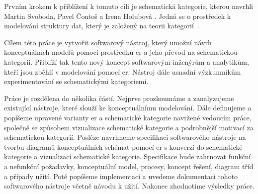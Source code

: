 Prvním krokem k přiblížení k tomuto cíli je schematická kategorie, kterou navrhli Martin Svoboda, Pavel Čontoš a Irena Holubová \cite{svoboda_categorical_2021}.
Jedná se o prostředek k modelování struktury dat, který je založený na teorii kategorií~\cite{eilenberg_generaltheory_1945}.

Cílem této práce je vytvořit softwarový nástroj, který umožní návrh konceptuálních modelů pomocí prostředků \acrshort{er} a jeho převod na schematickou kategorii.
Přiblíží tak tento nový koncept softwarovým inženýrům a analytikům, kteří jsou zběhlí v modelování pomocí \acrshort{er}.
Nástroj dále usnadní výzkumníkům experimentování se schematickými kategoriemi.

Práce je rozdělena do několika částí.
Nejprve prozkoumáme a zanalyzujeme existující nástroje, které slouží ke konceptuálnímu modelování.
Dále definujeme a popíšeme upravené varianty \acrshort{er} a schematické kategorie navržené vedoucím práce, společně se způsobem vizualizace schematické kategorie a podrobnější motivací za schematickou kategorií.
Posléze navrhneme specifikaci softwarového nástroje na tvorbu diagramů konceptuálních schémat pomocí \acrshort{er} s konverzí do schematické kategorie a vizualizací schematické kategorie.
Specifikace bude zahrnovat funkční a nefunkční požadavky, konceptuální model, procesy, koncept řešení, diagram tříd a případy užití.
Poté popíšeme implementaci a uvedeme dokumentaci tohoto softwarového nástroje včetně návodu k užití.
Nakonec zhodnotíme výsledky práce.
